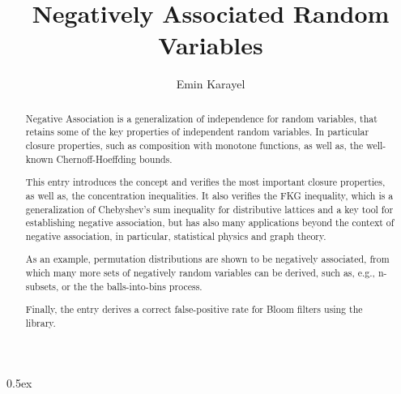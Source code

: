 \documentclass[11pt,a4paper]{article}
\begin{document}
\title{Negatively Associated Random Variables}
\author{Emin Karayel}
\maketitle

\begin{abstract}
Negative Association is a generalization of independence for random variables, that retains some
of the key properties of independent random variables. In particular closure properties, such as
composition with monotone functions, as well as, the well-known Chernoff-Hoeffding bounds.

This entry introduces the concept and verifies the most important closure properties, as well as,
the concentration inequalities. It also verifies the FKG inequality, which is a generalization of
Chebyshev's sum inequality for distributive lattices and a key tool for establishing negative
association, but has also many applications beyond the context of negative association, in 
particular, statistical physics and graph theory.

As an example, permutation distributions are shown to be negatively associated, from which
many more sets of negatively random variables can be derived, such as, e.g., n-subsets, or the 
the balls-into-bins process.

Finally, the entry derives a correct false-positive rate for Bloom filters using the library.
\end{abstract}

\tableofcontents

\parindent 0pt\parskip 0.5ex





\end{document}
